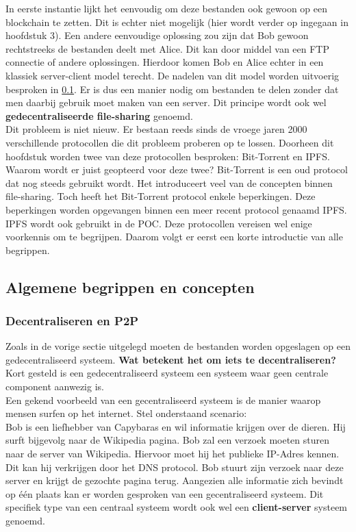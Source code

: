 In eerste instantie lijkt het eenvoudig om deze bestanden ook gewoon op een blockchain te zetten. Dit is echter niet mogelijk (hier wordt verder op ingegaan in hoofdstuk 3). Een andere eenvoudige oplossing zou zijn dat Bob gewoon rechtstreeks de bestanden deelt met Alice. Dit kan door middel van een FTP connectie of andere oplossingen. Hierdoor komen Bob en Alice echter in een klassiek server-client model terecht. De nadelen van dit model worden uitvoerig besproken in \ref{ipfs_decent}. Er is dus een manier nodig om bestanden te delen zonder dat men daarbij gebruik moet maken van een server. Dit principe wordt ook wel \textbf{gedecentraliseerde file-sharing} genoemd.\\

Dit probleem is niet nieuw. Er bestaan reeds sinds de vroege jaren 2000 verschillende protocollen die dit probleem proberen op te lossen. Doorheen dit hoofdstuk worden twee van deze protocollen besproken: Bit-Torrent en IPFS. Waarom wordt er juist geopteerd voor deze twee? Bit-Torrent is een oud protocol dat nog steeds gebruikt wordt. Het introduceert veel van de concepten binnen file-sharing. Toch heeft het Bit-Torrent protocol enkele beperkingen. Deze beperkingen worden opgevangen binnen een meer recent protocol genaamd IPFS. IPFS wordt ook gebruikt in de POC. Deze protocollen vereisen wel enige voorkennis om te begrijpen. Daarom volgt er eerst een korte introductie van alle begrippen.
\subsection{Algemene begrippen en concepten}
\label{ipfs_decent}

\subsubsection{Decentraliseren en P2P}
Zoals in de vorige sectie uitgelegd moeten de bestanden worden opgeslagen op een gedecentraliseerd systeem. \textbf{Wat betekent het om iets te decentraliseren?} Kort gesteld is een gedecentraliseerd systeem een systeem waar geen centrale component aanwezig is.\\

Een gekend voorbeeld van een gecentraliseerd systeem is de manier waarop mensen surfen op het internet. Stel onderstaand scenario:\\

Bob is een liefhebber van Capybaras en wil informatie krijgen over de dieren. Hij surft bijgevolg naar de Wikipedia pagina. Bob zal een verzoek moeten sturen naar de server van Wikipedia. Hiervoor moet hij het publieke IP-Adres kennen. Dit kan hij verkrijgen door het DNS protocol. Bob stuurt zijn verzoek naar deze server en krijgt de gezochte pagina terug. Aangezien alle informatie zich bevindt op één plaats kan er worden gesproken van een gecentraliseerd systeem. Dit specifiek type van een centraal systeem wordt ook wel een \textbf{client-server} systeem genoemd.\\

